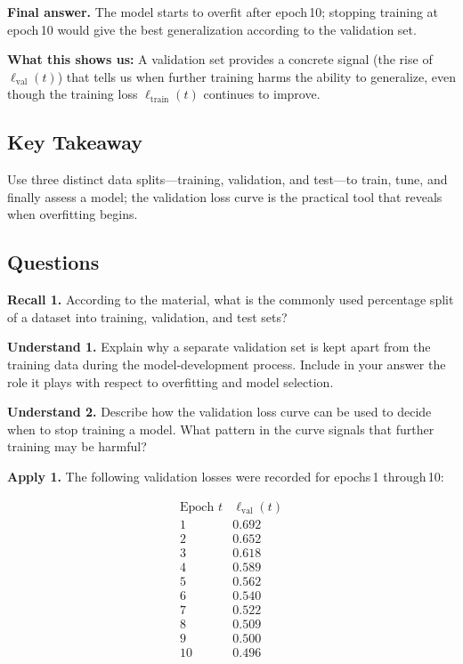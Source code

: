 \documentclass[12pt, a4paper]{article}
\begin{document}
\textbf{Final answer.}  
The model starts to overfit after epoch 10; stopping training at epoch 10 would give the best generalization according to the validation set.

\textbf{What this shows us:}  
A validation set provides a concrete signal (the rise of \(\ell_{\text{val}}(t)\)) that tells us when further training harms the ability to generalize, even though the training loss \(\ell_{\text{train}}(t)\) continues to improve.

\subsection{Key Takeaway}
Use three distinct data splits—training, validation, and test—to train, tune, and finally assess a model; the validation loss curve is the practical tool that reveals when overfitting begins.

\subsection{Questions}
\textbf{Recall 1.} According to the material, what is the commonly used percentage split of a dataset into training, validation, and test sets?\newpage

\textbf{Understand 1.} Explain why a separate validation set is kept apart from the training data during the model‑development process. Include in your answer the role it plays with respect to overfitting and model selection.\newpage

\textbf{Understand 2.} Describe how the validation loss curve can be used to decide when to stop training a model. What pattern in the curve signals that further training may be harmful?\newpage

\textbf{Apply 1.} The following validation losses were recorded for epochs 1 through 10:

\[
\begin{array}{c|c}
\text{Epoch } t & \ell_{\text{val}}(t) \\ \hline
1 & 0.692 \\ 
2 & 0.652 \\ 
3 & 0.618 \\ 
4 & 0.589 \\ 
5 & 0.562 \\ 
6 & 0.540 \\ 
7 & 0.522 \\ 
8 & 0.509 \\ 
9 & 0.500 \\ 
10& 0.496
\end{array}
\]
\end{document}
